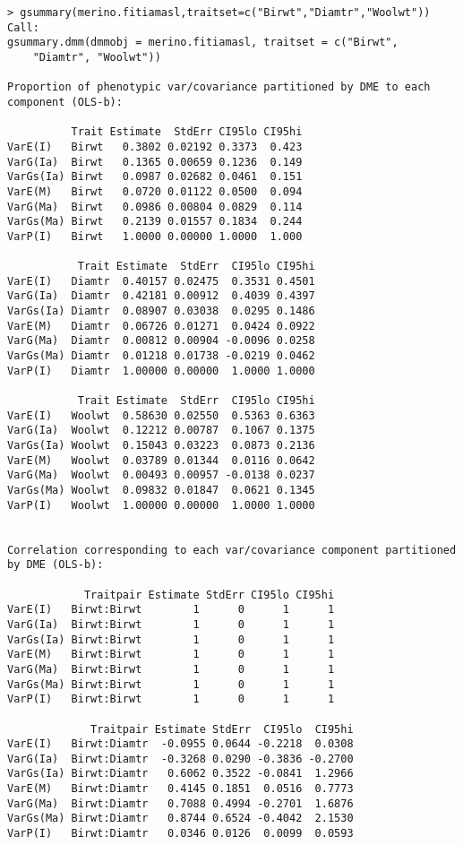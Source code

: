 \documentclass[titlepage]{article}  %
\begin{document}
\begin{verbatim}
> gsummary(merino.fitiamasl,traitset=c("Birwt","Diamtr","Woolwt"))
Call:
gsummary.dmm(dmmobj = merino.fitiamasl, traitset = c("Birwt", 
    "Diamtr", "Woolwt"))

Proportion of phenotypic var/covariance partitioned by DME to each component (OLS-b):

          Trait Estimate  StdErr CI95lo CI95hi
VarE(I)   Birwt   0.3802 0.02192 0.3373  0.423
VarG(Ia)  Birwt   0.1365 0.00659 0.1236  0.149
VarGs(Ia) Birwt   0.0987 0.02682 0.0461  0.151
VarE(M)   Birwt   0.0720 0.01122 0.0500  0.094
VarG(Ma)  Birwt   0.0986 0.00804 0.0829  0.114
VarGs(Ma) Birwt   0.2139 0.01557 0.1834  0.244
VarP(I)   Birwt   1.0000 0.00000 1.0000  1.000

           Trait Estimate  StdErr  CI95lo CI95hi
VarE(I)   Diamtr  0.40157 0.02475  0.3531 0.4501
VarG(Ia)  Diamtr  0.42181 0.00912  0.4039 0.4397
VarGs(Ia) Diamtr  0.08907 0.03038  0.0295 0.1486
VarE(M)   Diamtr  0.06726 0.01271  0.0424 0.0922
VarG(Ma)  Diamtr  0.00812 0.00904 -0.0096 0.0258
VarGs(Ma) Diamtr  0.01218 0.01738 -0.0219 0.0462
VarP(I)   Diamtr  1.00000 0.00000  1.0000 1.0000

           Trait Estimate  StdErr  CI95lo CI95hi
VarE(I)   Woolwt  0.58630 0.02550  0.5363 0.6363
VarG(Ia)  Woolwt  0.12212 0.00787  0.1067 0.1375
VarGs(Ia) Woolwt  0.15043 0.03223  0.0873 0.2136
VarE(M)   Woolwt  0.03789 0.01344  0.0116 0.0642
VarG(Ma)  Woolwt  0.00493 0.00957 -0.0138 0.0237
VarGs(Ma) Woolwt  0.09832 0.01847  0.0621 0.1345
VarP(I)   Woolwt  1.00000 0.00000  1.0000 1.0000


Correlation corresponding to each var/covariance component partitioned by DME (OLS-b):

            Traitpair Estimate StdErr CI95lo CI95hi
VarE(I)   Birwt:Birwt        1      0      1      1
VarG(Ia)  Birwt:Birwt        1      0      1      1
VarGs(Ia) Birwt:Birwt        1      0      1      1
VarE(M)   Birwt:Birwt        1      0      1      1
VarG(Ma)  Birwt:Birwt        1      0      1      1
VarGs(Ma) Birwt:Birwt        1      0      1      1
VarP(I)   Birwt:Birwt        1      0      1      1

             Traitpair Estimate StdErr  CI95lo  CI95hi
VarE(I)   Birwt:Diamtr  -0.0955 0.0644 -0.2218  0.0308
VarG(Ia)  Birwt:Diamtr  -0.3268 0.0290 -0.3836 -0.2700
VarGs(Ia) Birwt:Diamtr   0.6062 0.3522 -0.0841  1.2966
VarE(M)   Birwt:Diamtr   0.4145 0.1851  0.0516  0.7773
VarG(Ma)  Birwt:Diamtr   0.7088 0.4994 -0.2701  1.6876
VarGs(Ma) Birwt:Diamtr   0.8744 0.6524 -0.4042  2.1530
VarP(I)   Birwt:Diamtr   0.0346 0.0126  0.0099  0.0593


\end{verbatim}
\end{document}
